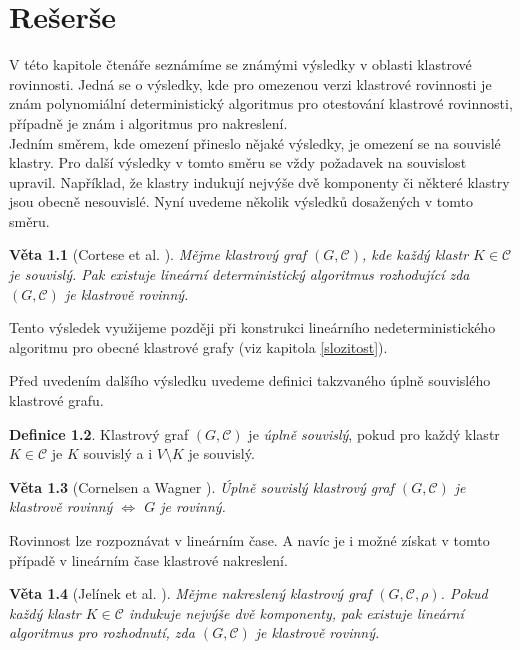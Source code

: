 \documentclass[12pt,a4report]{report}
\newtheorem{theorem}{Věta}[chapter]
\theoremstyle{definition}
\newtheorem{defn}[theorem]{Definice}
\begin{document}
\author{Filip Šedivý}

\chapter{Rešerše}
V této kapitole čtenáře seznámíme se známými výsledky v oblasti klastrové rovinnosti. Jedná se o výsledky, kde pro omezenou verzi klastrové rovinnosti je znám polynomiální deterministický algoritmus pro otestování klastrové rovinnosti, případně je znám i algoritmus pro nakreslení.\\

Jedním směrem, kde omezení přineslo nějaké výsledky, je omezení se na souvislé klastry. Pro další výsledky v tomto směru se vždy požadavek na souvislost upravil. Například, že klastry indukují nejvýše dvě komponenty či některé klastry jsou obecně nesouvislé. Nyní uvedeme několik výsledků dosažených v tomto směru.

\begin{theorem}[Cortese et al. \cite{CorteseEtAl08}]
\label{souv_klastry_det_alg}
Mějme klastrový graf $(G, \mathcal C)$, kde každý klastr $K \in \mathcal C$ je souvislý. Pak existuje lineární deterministický algoritmus rozhodující zda $(G, \mathcal C)$ je klastrově rovinný.
\end{theorem}

Tento výsledek využijeme později při konstrukci lineárního nedeterministického algoritmu pro obecné klastrové grafy (viz kapitola \ref{slozitost}).

Před uvedením dalšího výsledku uvedeme definici takzvaného úplně souvislého klastrové grafu.

\begin{defn}
Klastrový graf $(G, \mathcal C)$ je \textit{úplně souvislý}, pokud pro každý klastr $K \in \mathcal C$ je $K$ souvislý a i $V \setminus K$ je souvislý.
\end{defn}

\begin{theorem}[Cornelsen a Wagner \cite{CornelsenWagner03}]
Úplně souvislý klastrový graf $(G, \mathcal C)$ je  klastrově rovinný $\iff$ $G$ je rovinný.
\end{theorem}

Rovinnost lze rozpoznávat v lineárním čase. A navíc je i možné získat v tomto případě v lineárním čase klastrové nakreslení.

\begin{theorem}[Jelínek et al. \cite{JelinekEtAl08}]
Mějme nakreslený klastrový graf $(G, \mathcal C, \rho)$. Pokud každý klastr $K \in \mathcal C$ indukuje nejvýše dvě komponenty, pak existuje lineární algoritmus pro rozhodnutí, zda $(G, \mathcal C)$ je klastrově rovinný.
\end{theorem}
\end{document}
